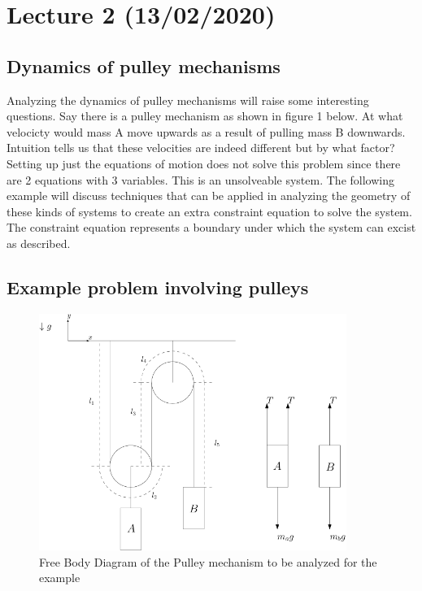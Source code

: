 \documentclass[11pt, a4paper]{article}
\begin{document}
\setcounter{section}{1}
\section{Lecture 2 (13/02/2020)}

\subsection{Dynamics of pulley mechanisms}
Analyzing the dynamics of pulley mechanisms will raise some interesting questions.
Say there is a pulley mechanism as shown in figure 1 below. At what velocicty would mass A
move upwards as a result of pulling mass B downwards. Intuition tells us that these velocities
are indeed different but by what factor? Setting up just the equations of motion does not solve this problem
since there are 2 equations with 3 variables. This is an unsolveable system. 
The following example will discuss techniques that can be applied in analyzing the geometry of these kinds of systems
to create an extra constraint equation to solve the system. The constraint equation represents a
boundary under which the system can excist as described.

\subsection{Example problem involving pulleys}
\begin{figure}[h]
    \centerline{\includegraphics[width=10cm]{images/Pulleys.png}}
    \caption{Free Body Diagram of the Pulley mechanism to be analyzed for the example}
\end{figure}
\end{document}
